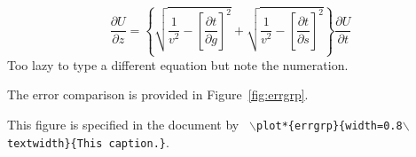 \documentclass{article}
\begin{document}

\begin{equation}
\frac{\partial U}{\partial z} = 
\left\{
  \sqrt{\frac{1}{v^2} - \left[\frac{\partial t}{\partial g}\right]^2} +
  \sqrt{\frac{1}{v^2} - \left[\frac{\partial t}{\partial s}\right]^2}
\right\}
\frac{\partial U}{\partial t}
\label{eqn:partial2}
\end{equation}
Too lazy to type a different equation but note the numeration.

The error comparison is provided in Figure~\ref{fig:errgrp}.

 {This figure is specified in the
  document by \texttt{
    $\backslash$plot*\{errgrp\}\{width=0.8$\backslash$textwidth\}\{This caption.\}}.  }

\onecolumn



\twocolumn

\end{document}
